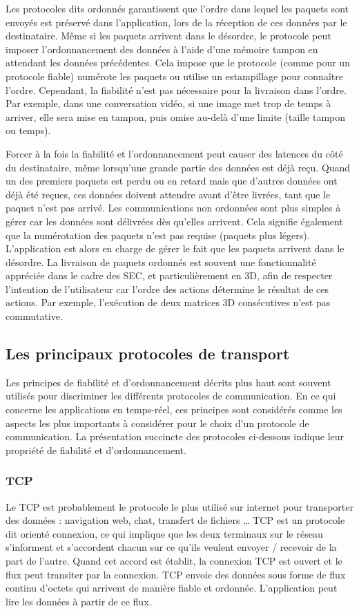 Les protocoles dits \og ordonnés\fg{} garantissent que l'ordre dans lequel les 
paquets sont envoyés est préservé dans l'application, lors de la réception de ces 
données par le destinataire. Même si les paquets arrivent dans le désordre, le 
protocole peut imposer l'ordonnancement des données à l'aide d'une mémoire 
tampon en attendant les données précédentes. Cela impose que le protocole 
(comme pour un protocole fiable) numérote les paquets ou utilise un estampillage 
pour connaître l'ordre. Cependant, la fiabilité n'est pas nécessaire pour la livraison 
dans l'ordre. Par exemple, dans une conversation vidéo, si une image met trop de 
temps à arriver, elle sera mise en tampon, puis omise au-delà d'une limite (taille 
tampon ou temps).

Forcer à la fois la fiabilité et l'ordonnancement peut causer des latences du côté 
du destinataire, même lorsqu'une grande partie des données est déjà reçu. Quand 
un des premiers paquets est perdu ou en retard mais que d'autres données ont 
déjà été reçues, ces données doivent attendre avant d'être livrées, tant que le 
paquet n'est pas arrivé. Les communications non ordonnées sont plus simples à 
gérer car les données sont délivrées dès qu'elles arrivent. Cela signifie également 
que la numérotation des paquets n'est pas requise (paquets plus légers). 
L'application est alors en charge de gérer le fait que les paquets arrivent dans le 
désordre. La livraison de paquets ordonnés est souvent une fonctionnalité 
appréciée dans le 
cadre des \gls{SEC}, et particulièrement en 3D, afin de respecter l'intention de 
l'utilisateur car l'ordre des actions détermine le résultat de ces actions. Par 
exemple, l'exécution de deux matrices 3D consécutives n'est pas commutative.

\subsection{Les principaux protocoles de transport}
Les principes de fiabilité et d'ordonnancement décrits plus haut sont souvent 
utilisés pour discriminer les différents protocoles de communication. En ce qui concerne les 
applications en temps-réel, ces principes sont considérés comme les aspects les plus 
importants à considérer pour le choix d'un protocole de communication. La 
présentation succincte des protocoles ci-dessous indique leur propriété de 
fiabilité et d'ordonnancement.
\subsubsection{TCP}
Le \gls{TCP} est probablement le protocole le plus utilisé sur internet pour 
transporter des données : navigation web, chat, transfert de fichiers \dots 
\gls{TCP} est un protocole dit \og orienté connexion\fg{}, ce qui implique que les 
deux terminaux sur le réseau s'informent et s'accordent chacun sur ce qu'ils 
veulent envoyer / recevoir de la part de l'autre. 
Quand cet accord est établit, la connexion \gls{TCP} est ouvert et le flux peut 
transiter par la connexion. 
\gls{TCP} envoie des données sous forme de flux continu d'octets qui arrivent de 
manière fiable et ordonnée. 
L'application peut lire les données à partir de ce flux.

